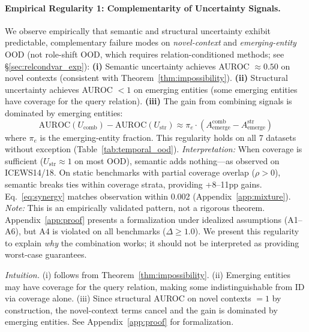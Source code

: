 \paragraph{Empirical Regularity 1: Complementarity of Uncertainty Signals.}
\label{reg:complementarity}
We observe empirically that semantic and structural uncertainty exhibit predictable, complementary failure modes on \emph{novel-context} and \emph{emerging-entity} OOD (not role-shift OOD, which requires relation-conditioned methods; see \S\ref{sec:relcondvar_exp}):
\textbf{(i)} Semantic uncertainty achieves AUROC $\approx 0.50$ on novel contexts (consistent with Theorem~\ref{thm:impossibility}).
\textbf{(ii)} Structural uncertainty achieves AUROC $< 1$ on emerging entities (some emerging entities have coverage for the query relation).
\textbf{(iii)} The gain from combining signals is dominated by emerging entities:
\begin{equation}
\text{AUROC}(U_{\text{comb}}) - \text{AUROC}(U_{\text{str}}) \approx \pi_e \cdot \left(A_{\text{emerge}}^{\text{comb}}-A_{\text{emerge}}^{\text{str}}\right)
\label{eq:synergy}
\end{equation}
where $\pi_e$ is the emerging-entity fraction. This regularity holds on all 7 datasets without exception (Table~\ref{tab:temporal_ood}). \emph{Interpretation:} When coverage is sufficient ($U_{\text{str}} \approx 1$ on most OOD), semantic adds nothing---as observed on ICEWS14/18. On static benchmarks with partial coverage overlap ($\rho > 0$), semantic breaks ties within coverage strata, providing +8--11pp gains. Eq.~\ref{eq:synergy} matches observation within 0.002 (Appendix~\ref{app:mixture}). \emph{Note:} This is an empirically validated pattern, not a rigorous theorem. Appendix~\ref{app:proof} presents a formalization under idealized assumptions (A1--A6), but A4 is violated on all benchmarks ($\Delta \geq 1.0$). We present this regularity to explain \emph{why} the combination works; it should not be interpreted as providing worst-case guarantees.

\emph{Intuition.} (i) follows from Theorem~\ref{thm:impossibility}. (ii) Emerging entities may have coverage for the query relation, making some indistinguishable from ID via coverage alone. (iii) Since structural AUROC on novel contexts $= 1$ by construction, the novel-context terms cancel and the gain is dominated by emerging entities. See Appendix~\ref{app:proof} for formalization.

